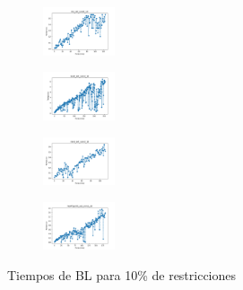 \begin{figure}[H]
\begin{subfigure}
        \centering
        \includegraphics[width=0.234\textwidth]{img/bl/iris_set_const_10_3773969821_time.png}
    \end{subfigure}
    \hfill
    \begin{subfigure}
        \centering
        \includegraphics[width=0.234\textwidth]{img/bl/ecoli_set_const_10_3773969821_time.png}
    \end{subfigure}
    \hfill
    \begin{subfigure}
        \centering
        \includegraphics[width=0.234\textwidth]{img/bl/rand_set_const_10_3773969821_time.png}
    \end{subfigure}
    \hfill
    \begin{subfigure}
        \centering
        \includegraphics[width=0.234\textwidth]{img/bl/newthyroid_set_const_10_3773969821_time.png}
    \end{subfigure}
    \caption{Tiempos de BL para 10\% de restricciones}
\end{figure}

\vspace*{\fill}
\newpage
\vspace*{\fill}

